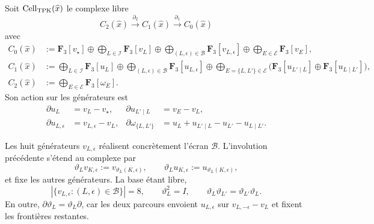 \begin{definition}
\label{def:pdfv2-cor-completacion-celular-tpk}
Soit \(\operatorname{Cell}_{\rm TPK}(\widehat x)\) le complexe libre
\[
 C_2(\widehat x)\xrightarrow{\partial_2}
 C_1(\widehat x)\xrightarrow{\partial_1}C_0(\widehat x)
\]
avec
\begin{align*}
 C_0(\widehat x)
 &:=
 \mathbf F_3[v_\star]\oplus
 \bigoplus_{L\in\mathscr I}\mathbf F_3[v_L]\oplus
 \bigoplus_{(L,\epsilon)\in\mathscr B}
       \mathbf F_3[v_{L,\epsilon}]\oplus
 \bigoplus_{E\in\mathscr E}\mathbf F_3[v_E],\\
 C_1(\widehat x)
 &:=
 \bigoplus_{L\in\mathscr I}\mathbf F_3[u_L]\oplus
 \bigoplus_{(L,\epsilon)\in\mathscr B}
       \mathbf F_3[u_{L,\epsilon}]\oplus
 \bigoplus_{E=\{L,L'\}\in\mathscr E}
 \bigl(\mathbf F_3[u_{L'\mid L}]
       \oplus\mathbf F_3[u_{L\mid L'}]\bigr),\\
 C_2(\widehat x)
 &:=
 \bigoplus_{E\in\mathscr E}\mathbf F_3[\omega_E].
\end{align*}
Son action sur les générateurs est
\begin{align}
 \partial u_L&=v_L-v_\star,
 &
 \partial u_{L'\mid L}&=v_E-v_L,
 \label{eq:pdfv2-cor-cell-frontera-aristas}\\
 \partial u_{L,\epsilon}&=v_{L,\epsilon}-v_L,
 &
 \partial\omega_{\{L,L'\}}
 &=u_L+u_{L'\mid L}-u_{L'}-u_{L\mid L'}.
 \label{eq:pdfv2-cor-cell-frontera-celda}
\end{align}
\end{definition}

Les huit générateurs \(v_{L,\epsilon}\) réalisent concrètement l'écran \(\mathscr B\). L'involution précédente s'étend au complexe par
\begin{equation}
\label{eq:pdfv2-cor-pantalla-ocho-generadores}
 \vartheta_Lv_{K,\epsilon}:=v_{\vartheta_L(K,\epsilon)},\qquad
 \vartheta_Lu_{K,\epsilon}:=u_{\vartheta_L(K,\epsilon)},
\end{equation}
et fixe les autres générateurs. La base étant libre,
\begin{equation}
\label{eq:pdfv2-cor-pantalla-ocho-no-colapso}
 |\{v_{L,\epsilon}:(L,\epsilon)\in\mathscr B\}|=8,\qquad
 \vartheta_L^2=I,\qquad
 \vartheta_L\vartheta_{L'}=\vartheta_{L'}\vartheta_L.
\end{equation}
En outre, \(\partial\vartheta_L=\vartheta_L\partial\), car les deux parcours envoient \(u_{L,\epsilon}\) sur \(v_{L,-\epsilon}-v_L\) et fixent les frontières restantes.

